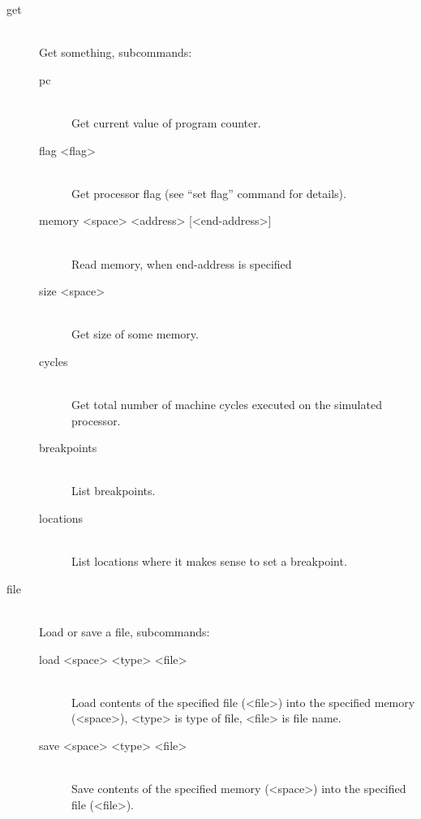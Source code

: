 \begin{description}
            \item[get]~\\
                Get something, subcommands:
                \begin{description}
                    \item[pc]~\\
                        Get current value of program counter.
                    \item[flag <flag>]~\\
                        Get processor flag (see ``set flag'' command for details).
                    \item[memory <space> <address> {[}<end-address>{]}]~\\
                        Read memory, when end-address is specified
                    \item[size <space>]~\\
                        Get size of some memory.
                    \item[cycles]~\\
                        Get total number of machine cycles executed on the simulated processor.
                    \item[breakpoints]~\\
                        List breakpoints.
                    \item[locations]~\\
                        List locations where it makes sense to set a breakpoint.
                \end{description}

            \item[file]~\\
                Load or save a file, subcommands:
                \begin{description}
                    \item[load <space> <type> <file>]~\\
                        Load contents of the specified file (<file>) into the specified memory (<space>), <type> is type of file, <file> is file name.
                    \item[save <space> <type> <file>]~\\
                        Save contents of the specified memory (<space>) into the specified file (<file>).
                \end{description}


\end{description}
